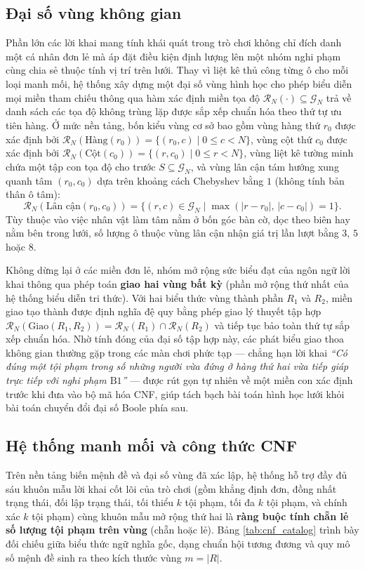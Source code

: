 \subsection{Đại số vùng không gian}
\label{subsec:region_algebra}
Phần lớn các lời khai mang tính khái quát trong trò chơi không chỉ đích danh một
cá nhân đơn lẻ mà áp đặt điều kiện định lượng lên một nhóm nghi phạm cùng chia sẻ
thuộc tính vị trí trên lưới. Thay vì liệt kê thủ công từng ô cho mỗi loại manh
mối, hệ thống xây dựng một đại số vùng hình học cho phép biểu diễn mọi miền tham
chiếu thông qua hàm xác định miền tọa độ $\mathcal{R}_N(\cdot) \subseteq
\mathcal{G}_N$ trả về danh sách các tọa độ không trùng lặp được sắp xếp chuẩn hóa
theo thứ tự ưu tiên hàng. Ở mức nền tảng, bốn kiểu vùng cơ sở bao gồm vùng hàng
thứ $r_0$ được xác định bởi $\mathcal{R}_N(\text{Hàng}(r_0)) = \{(r_0, c) \mid 0
\le c < N\}$, vùng cột thứ $c_0$ được xác định bởi $\mathcal{R}_N(\text{Cột}(c_0))
= \{(r, c_0) \mid 0 \le r < N\}$, vùng liệt kê tường minh chứa một tập con tọa độ
cho trước $S \subseteq \mathcal{G}_N$, và vùng lân cận tám hướng xung quanh tâm
$(r_0, c_0)$ dựa trên khoảng cách Chebyshev bằng $1$ (không tính bản thân ô tâm):
\begin{equation}
    \mathcal{R}_N(\text{Lân cận}(r_0, c_0)) = \{
        (r, c) \in \mathcal{G}_N \mid \max(|r - r_0|,\, |c - c_0|) = 1
    \}.
\end{equation}
Tùy thuộc vào việc nhân vật làm tâm nằm ở bốn góc bàn cờ, dọc theo biên hay nằm
bên trong lưới, số lượng ô thuộc vùng lân cận nhận giá trị lần lượt bằng $3$, $5$
hoặc $8$.

Không dừng lại ở các miền đơn lẻ, nhóm mở rộng sức biểu đạt của ngôn ngữ lời khai
thông qua phép toán \textbf{giao hai vùng bất kỳ} (phần mở rộng thứ nhất của hệ
thống biểu diễn tri thức). Với hai biểu thức vùng thành phần $R_1$ và $R_2$, miền
giao tạo thành được định nghĩa đệ quy bằng phép giao lý thuyết tập hợp
$\mathcal{R}_N(\text{Giao}(R_1, R_2)) = \mathcal{R}_N(R_1) \cap
\mathcal{R}_N(R_2)$ và tiếp tục bảo toàn thứ tự sắp xếp chuẩn hóa. Nhờ tính đóng
của đại số tập hợp này, các phát biểu giao thoa không gian thường gặp trong các
màn chơi phức tạp --- chẳng hạn lời khai \textit{``Có đúng một tội phạm trong số
những người vừa đứng ở hàng thứ hai vừa tiếp giáp trực tiếp với nghi phạm
$\text{B1}$''} --- được rút gọn tự nhiên về một miền con xác định trước khi đưa
vào bộ mã hóa CNF, giúp tách bạch bài toán hình học lưới khỏi bài toán chuyển đổi
đại số Boole phía sau.

\subsection{Hệ thống manh mối và công thức CNF}
\label{subsec:clue_catalog}
Trên nền tảng biến mệnh đề và đại số vùng đã xác lập, hệ thống hỗ trợ đầy đủ sáu
khuôn mẫu lời khai cốt lõi của trò chơi (gồm khẳng định đơn, đồng nhất trạng thái,
đối lập trạng thái, tối thiểu $k$ tội phạm, tối đa $k$ tội phạm, và chính xác $k$
tội phạm) cùng khuôn mẫu mở rộng thứ hai là \textbf{ràng buộc tính chẵn lẻ số
lượng tội phạm trên vùng} (chẵn hoặc lẻ). Bảng \ref{tab:cnf_catalog} trình bày
đối chiếu giữa biểu thức ngữ nghĩa gốc, dạng chuẩn hội tương đương và quy mô số
mệnh đề sinh ra theo kích thước vùng $m = |R|$.

